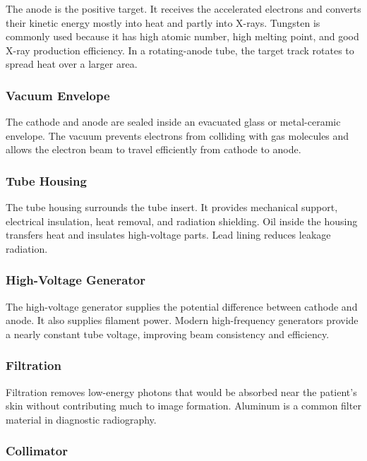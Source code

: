 \documentclass[12pt]{article}
\begin{document}
The anode is the positive target. It receives the accelerated electrons and converts their kinetic energy mostly into heat and partly into X-rays. Tungsten is commonly used because it has high atomic number, high melting point, and good X-ray production efficiency. In a rotating-anode tube, the target track rotates to spread heat over a larger area.

\subsubsection{Vacuum Envelope}

The cathode and anode are sealed inside an evacuated glass or metal-ceramic envelope. The vacuum prevents electrons from colliding with gas molecules and allows the electron beam to travel efficiently from cathode to anode.

\subsubsection{Tube Housing}

The tube housing surrounds the tube insert. It provides mechanical support, electrical insulation, heat removal, and radiation shielding. Oil inside the housing transfers heat and insulates high-voltage parts. Lead lining reduces leakage radiation.

\subsubsection{High-Voltage Generator}

The high-voltage generator supplies the potential difference between cathode and anode. It also supplies filament power. Modern high-frequency generators provide a nearly constant tube voltage, improving beam consistency and efficiency.

\subsubsection{Filtration}

Filtration removes low-energy photons that would be absorbed near the patient's skin without contributing much to image formation. Aluminum is a common filter material in diagnostic radiography.

\subsubsection{Collimator}
\end{document}
